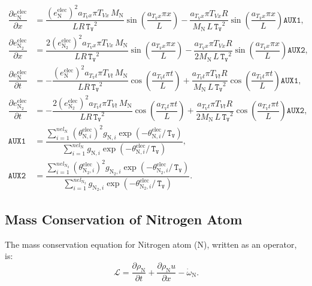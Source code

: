 \documentclass[10pt]{article}
\newcommand{\diff}[2] {\dfrac{\partial #1 }{\partial #2}}
\newcommand{\Lo}{\,\mathcal{L}}
\newcommand{\TV}{\,\mathtt{T_V}}
\newcommand{\N}{\text{N}}
\newcommand{\elec}{\text{elec}}
\begin{document}
\begin{equation}
\begin{split}\label{eq:aux_01}
\diff{e_{\N}^{\elec}}{x} &= \dfrac{(e_{\N}^{\elec})^2  a_{T_V x} \pi T_{Vx} \,M_\N}{ LR \TV^2}\sin\left(\dfrac{a_{T_V x} \pi x}{L}\right) - \dfrac{  a_{T_V x} \pi T_{Vx} R }{M_\N \, L \TV^2 }\sin\left(\dfrac{a_{T_V x} \pi x}{L}\right)\mathtt{AUX1},	\\
%
\diff{e_{\N_2}^{\elec}}{x} &= \dfrac{2 (e_{\N_2}^{\elec})^2 a_{T_V x} \pi T_{Vx} \,M_\N}{ LR \TV^2}\sin\left(\dfrac{a_{T_V x} \pi x}{L}\right)- \dfrac{  a_{T_V x} \pi T_{Vx} R }{2M_\N \, L \TV^2 }\sin\left(\dfrac{a_{T_V x} \pi x}{L}\right)\mathtt{AUX2},	\\
\diff{e_{\N}^{\elec}}{t}  &= -\dfrac{(e_{\N}^{\elec})^2 a_{T_V t} \pi T_{Vt}\, M_\N }{L R \TV^2} \cos\left(\dfrac{a_{T_V t} \pi t}{L}\right)+\dfrac{a_{T_V t} \pi T_{Vt} R }{M_\N\, L  \TV^2}\cos\left(\dfrac{a_{T_V t} \pi t}{L}\right) \texttt{AUX1},\\
%
\diff{e_{\N_2}^{\elec}}{t} &= -\dfrac{2 (e_{\N_2}^{\elec})^2 a_{T_V t} \pi T_{Vt} \, M_\N }{L R \TV^2}\cos\left(\dfrac{a_{T_V t} \pi t}{L}\right) + \dfrac{a_{T_V t} \pi T_{Vt} R  }{2M_\N\, L  \TV^2} \cos\left(\dfrac{a_{T_V t} \pi t}{L}\right)\texttt{AUX2},\\
\texttt{AUX1} &= \dfrac{\sum_{i=1}^{nel_{\N}}( \theta^{\elec}_{\N,i})^2 g_{\N,i} \exp\left(- \theta^{\elec}_{\N,i}/ \TV \right)} { \sum_{i=1}^{nel_{\N}} g_{\N,i} \exp\left(-\theta^{\elec}_{\N,i}/\TV\right)},	\\
%
\texttt{AUX2} &= \dfrac{\sum_{i=1}^{nel_{\N_2}}( \theta^{\elec}_{\N_2,i})^2 g_{\N_2,i} \exp\left(- \theta^{\elec}_{\N_2,i} / \TV \right)} {\sum_{i=1}^{nel_{\N_2}} g_{\N_2,i} \exp\left(-\theta^{\elec}_{\N_2,i}/\TV\right)}.
%	
\end{split}
\end{equation}





\subsection{Mass Conservation of Nitrogen Atom}

The mass conservation equation for Nitrogen atom (N), written as an operator, is:
\begin{equation*}
 \label{eq:euler1d_11}
\Lo = \diff{\rho_{\text{N}}}{t}+ \diff{\rho_\text{N} u}{x} - \dot{\omega}_{\text{N}}.
\end{equation*}
\end{document}
